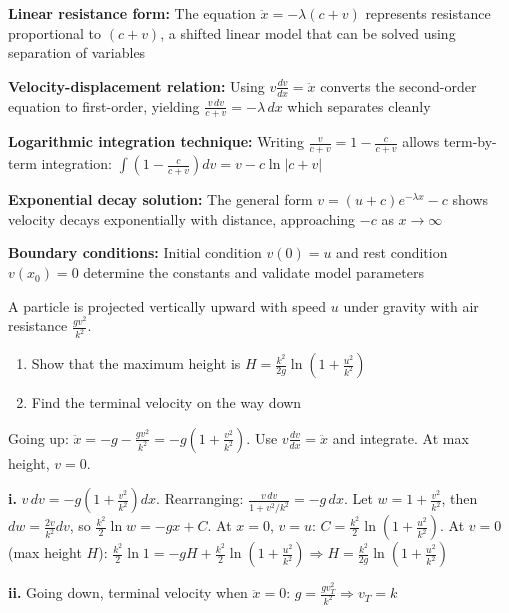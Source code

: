 \begin{takeaways}
\item \textbf{Linear resistance form:} The equation $\ddot{x} = -\lambda(c+v)$ represents resistance proportional to $(c+v)$, a shifted linear model that can be solved using separation of variables
\item \textbf{Velocity-displacement relation:} Using $v\frac{dv}{dx} = \ddot{x}$ converts the second-order equation to first-order, yielding $\frac{v\,dv}{c+v} = -\lambda\,dx$ which separates cleanly
\item \textbf{Logarithmic integration technique:} Writing $\frac{v}{c+v} = 1 - \frac{c}{c+v}$ allows term-by-term integration: $\int\left(1 - \frac{c}{c+v}\right)dv = v - c\ln|c+v|$
\item \textbf{Exponential decay solution:} The general form $v = (u+c)e^{-\lambda x} - c$ shows velocity decays exponentially with distance, approaching $-c$ as $x \to \infty$
\item \textbf{Boundary conditions:} Initial condition $v(0) = u$ and rest condition $v(x_0) = 0$ determine the constants and validate model parameters
\end{takeaways}

\begin{problem}
A particle is projected vertically upward with speed $u$ under gravity with air resistance $\frac{gv^2}{k^2}$.
\begin{enumerate}[label=\textbf{\roman*.}]
    \item Show that the maximum height is $H = \frac{k^2}{2g}\ln\left(1 + \frac{u^2}{k^2}\right)$
    \item Find the terminal velocity on the way down
\end{enumerate}
\end{problem}

\begin{hint}
Going up: $\ddot{x} = -g - \frac{gv^2}{k^2} = -g\left(1 + \frac{v^2}{k^2}\right)$. Use $v\frac{dv}{dx} = \ddot{x}$ and integrate. At max height, $v = 0$.
\end{hint}

\begin{solution}
\textbf{i.} $v\,dv = -g\left(1 + \frac{v^2}{k^2}\right)dx$. Rearranging: $\frac{v\,dv}{1 + v^2/k^2} = -g\,dx$. Let $w = 1 + \frac{v^2}{k^2}$, then $dw = \frac{2v}{k^2}dv$, so $\frac{k^2}{2}\ln w = -gx + C$. At $x=0$, $v=u$: $C = \frac{k^2}{2}\ln(1+\frac{u^2}{k^2})$. At $v=0$ (max height $H$): $\frac{k^2}{2}\ln 1 = -gH + \frac{k^2}{2}\ln(1+\frac{u^2}{k^2}) \Rightarrow H = \frac{k^2}{2g}\ln(1+\frac{u^2}{k^2})$ 

\textbf{ii.} Going down, terminal velocity when $\ddot{x} = 0$: $g = \frac{gv_T^2}{k^2} \Rightarrow v_T = k$
\end{solution}

